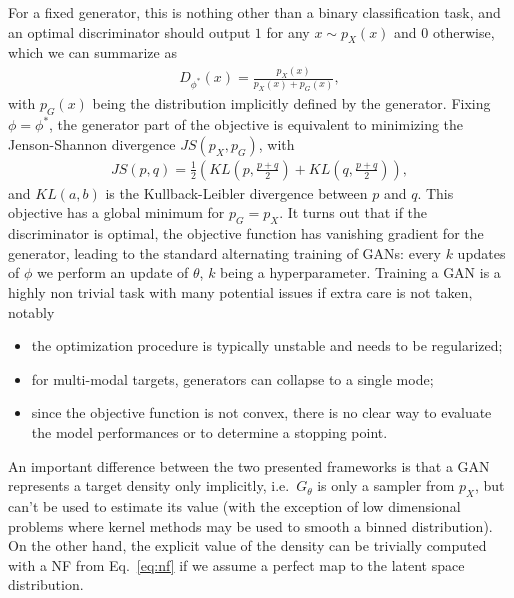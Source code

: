 %
For a fixed generator, this is nothing other than a binary classification task, and an optimal discriminator should output $1$ for any $x \sim p_{X}(x)$ and $0$ otherwise, which we can summarize as
%
\begin{align}
D_{\phi^{*}}(x) = \frac{p_{X}(x)}{p_{X}(x) + p_{G}(x)},
\end{align}
%
with $p_{G}(x)$ being the distribution implicitly defined by the generator. 
Fixing $\phi = \phi^{*}$, the generator part of the objective is equivalent to minimizing the Jenson-Shannon divergence $JS(p_{X}, p_{G})$, with
%
\begin{align}
JS\left(p, q\right) = \frac{1}{2} \left(KL\left(p, \frac{p + q}{2}\right) + KL\left(q, \frac{p + q}{2}\right) \right),
\end{align}
%
and $KL(a, b)$ is the Kullback-Leibler divergence between $p$ and $q$. This objective has a global minimum for $p_{G} = p_{X}$.
It turns out that if the discriminator is optimal, the objective function has vanishing gradient for the generator, leading to the standard alternating training of GANs: every $k$ updates of $\phi$ we perform an update of $\theta$, $k$ being a hyperparameter.
Training a GAN is a highly non trivial task with many potential issues if extra care is not taken, notably
\begin{itemize}
\item
the optimization procedure is typically unstable and needs to be regularized;
\item
for multi-modal targets, generators can collapse to a single mode;
\item
since the objective function is not convex, there is no clear way to evaluate the model performances or to determine a stopping point.
\end{itemize}

An important difference between the two presented frameworks is that a GAN represents a target density only implicitly, i.e.\    $G_{\theta}$ is only a sampler from $p_{X}$, but can't be used to estimate its value (with the exception of low dimensional problems where kernel methods may be used to smooth a binned distribution). On the other hand, the explicit value of the density can be trivially computed with a NF from Eq.~\ref{eq:nf} if we assume a perfect map to the latent space distribution.

